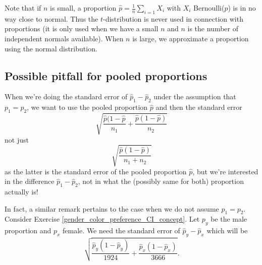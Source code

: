 Note that if $n$ is small, a proportion $\hat p  = \frac1n\sum_{i=1}X_i$ with $X_i$ Bernoulli($p$) is in no way close to normal. Thus the $t$-distribution is never used in connection with proportions (it is only used when we have a small $n$ and $n$ is the number of independent normals available). When $n$ is large, we approximate a proportion using the normal distribution.










\subsection{Possible pitfall for pooled proportions}%
When we're doing the standard error of $\hat p_1-\hat p_2$ under the assumption that $p_1=p_2$, we want to use the
pooled proportion $\hat p$ and then the standard error
\[
	\sqrt{\frac{\hat p(1-\hat p}{n_1}+\frac{\hat p(1-\hat p)}{n_2}}
\]
not just
\[
	\sqrt{\frac{\hat p(1-\hat p)}{n_1+n_2}}
\]
as the latter is the standard error of the pooled proportion $\hat p$, but we're interested in the difference $\hat p_1-\hat p_2$, not in what the (possibly same for both) proportion actually is!

In fact, a similar remark pertains to the case when we do not assume $p_1=p_2$. Consider Exercise \ref{gender_color_preference_CI_concept}. %
Let $p_y$ be the male proportion and $p_x$ female.
We need the standard error of $\hat p_y-\hat p_x$ which will be
\[
	\sqrt{\frac{\hat p_y(1-\hat p_y)}{1924}+\frac{\hat p_x(1-\hat p_x)}{3666}}.
\]


